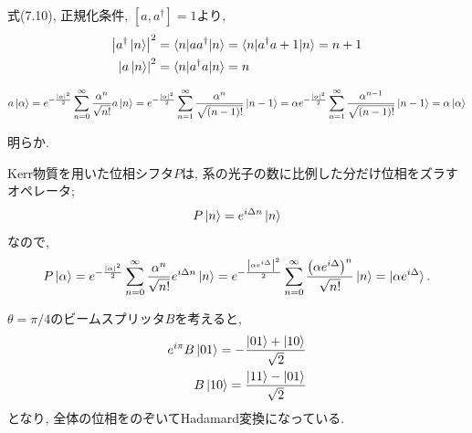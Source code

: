 \begin{ex}
    \label{ex7.5}
    式(7.10), 正規化条件, $\left[a,a^\dagger\right] = 1$より,
    \begin{align*}
        \left| a^\dagger \ket{n}\right|^2 & = \braket{n|aa^\dagger|n} =
        \braket{n|a^\dagger a + 1|n} = n+1
        \\
        \left| a \ket{n}\right|^2         & = \braket{n|a^\dagger a|n} = n
    \end{align*}
\end{ex}

\begin{ex}
    \label{ex7.6}
    \begin{align*}
        a \ket{\alpha}
        =
        e^{-\frac{|\alpha|^2}{2}} \sum_{n=0}^\infty \frac{\alpha^n}{\sqrt{n!}} a \ket{n}
        =
        e^{-\frac{|\alpha|^2}{2}} \sum_{n=1}^\infty \frac{\alpha^n}{\sqrt{(n-1)!}}  \ket{n-1}
        =
        \alpha
        e^{-\frac{|\alpha|^2}{2}} \sum_{n=1}^\infty \frac{\alpha^{n-1}}{\sqrt{(n-1)!}}  \ket{n-1}
        =
        \alpha \ket{\alpha}
    \end{align*}
\end{ex}

\begin{ex}
    \label{ex7.7}
    明らか.
\end{ex}

\begin{ex}
    \label{ex7.8}
    Kerr物質を用いた位相シフタ$P$は, 系の光子の数に比例した分だけ位相をズラすオペレータ;
    \begin{align*}
        P\ket{n} = e^{i \Delta n} \ket{n}
    \end{align*}
    なので,
    \begin{align*}
        P \ket{\alpha}
        =
        e^{-\frac{|\alpha|^2}{2}}
        \sum_{n=0}^\infty \frac{\alpha^n}{\sqrt{n!}}e^{i \Delta n} \ket{n}
        =
        e^{-\frac{\left|\alpha e^{i \Delta} \right|^2}{2}}
        \sum_{n=0}^\infty \frac{ \left( {\alpha e^{i \Delta }}\right)^n}{\sqrt{n!}} \ket{n}
        =
        \ket{\alpha e^{i\Delta}}.
    \end{align*}
\end{ex}

\begin{ex}
    \label{ex7.9}
    $\theta = \pi / 4$のビームスプリッタ$B$を考えると,
    \begin{align*}
        e^{i \pi} B\ket{01} = - \frac{\ket{01} + \ket{10}}{\sqrt{2}} \\
        B \ket{10} = \frac{\ket{11} - \ket{01}}{\sqrt{2}}
    \end{align*}
    となり, 全体の位相をのぞいてHadamard変換になっている.
\end{ex}

